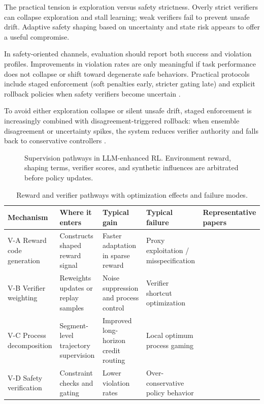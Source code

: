 ﻿\documentclass[conference]{IEEEtran}
\begin{document}
The practical tension is exploration versus safety strictness. Overly strict verifiers can collapse exploration and stall learning; weak verifiers fail to prevent unsafe drift. Adaptive safety shaping based on uncertainty and state risk appears to offer a useful compromise.

In safety-oriented channels, evaluation should report both success and violation profiles. Improvements in violation rates are only meaningful if task performance does not collapse or shift toward degenerate safe behaviors. Practical protocols include staged enforcement (soft penalties early, stricter gating late) and explicit rollback policies when safety verifiers become uncertain \cite{arxiv_p_2512_05686,arxiv_p_2602_09367,arxiv_p_2602_13156,arxiv_p_2602_06493}.

To avoid either exploration collapse or silent unsafe drift, staged enforcement is increasingly combined with disagreement-triggered rollback: when ensemble disagreement or uncertainty spikes, the system reduces verifier authority and falls back to conservative controllers \cite{arxiv_p_2602_02395,arxiv_p_2508_03680}.

\begin{figure}[t]
\centering
\resizebox{0.95\textwidth}{!}{}
\caption{Supervision pathways in LLM-enhanced RL. Environment reward, shaping terms, verifier scores, and synthetic influences are arbitrated before policy updates.}
\label{fig:supervision}
\end{figure}

\begin{table}[t]
\centering
\small
\setlength{\tabcolsep}{4pt}
\begin{tabularx}{\textwidth}{P{2.2cm}P{2.8cm}P{2.0cm}P{2.2cm}Y}
\toprule
\textbf{Mechanism} & \textbf{Where it enters} & \textbf{Typical gain} & \textbf{Typical failure} & \textbf{Representative papers}\\
\midrule
V-A Reward code generation & Constructs shaped reward signal & Faster adaptation in sparse reward & Proxy exploitation / misspecification & \cite{arxiv_p_2310_12931,arxiv_p_2309_06687,arxiv_p_2309_11489}\\
V-B Verifier weighting & Reweights updates or replay samples & Noise suppression and process control & Verifier shortcut optimization & \cite{arxiv_p_2602_06493,arxiv_p_2602_12579,arxiv_p_2602_02395}\\
V-C Process decomposition & Segment-level trajectory supervision & Improved long-horizon credit routing & Local optimum process gaming & \cite{arxiv_p_2510_20867,doi_p_10_48448_0js4_fm43,arxiv_p_2602_11551}\\
V-D Safety verification & Constraint checks and gating & Lower violation rates & Over-conservative policy behavior & \cite{arxiv_p_2512_05686,arxiv_p_2602_09367,arxiv_p_2602_13156}\\
\bottomrule
\end{tabularx}
\caption{Reward and verifier pathways with optimization effects and failure modes.}
\label{tab:t2_reward}
\end{table}
\end{document}
